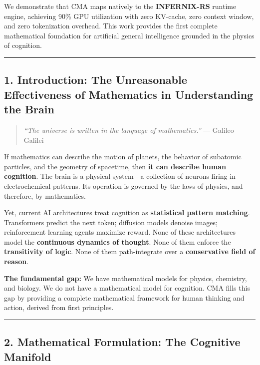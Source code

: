 \documentclass[
  11pt,
  a4paper,
]{article}
\begin{document}
We demonstrate that CMA maps natively to the \textbf{INFERNIX-RS}
runtime engine, achieving 90\% GPU utilization with zero KV-cache, zero
context window, and zero tokenization overhead. This work provides the
first complete mathematical foundation for artificial general
intelligence grounded in the physics of cognition.

\begin{center}\rule{0.5\linewidth}{0.5pt}\end{center}

\subsection{1. Introduction: The Unreasonable Effectiveness of
Mathematics in Understanding the
Brain}\label{introduction-the-unreasonable-effectiveness-of-mathematics-in-understanding-the-brain}

\begin{quote}
\emph{``The universe is written in the language of mathematics.''} ---
Galileo Galilei
\end{quote}

If mathematics can describe the motion of planets, the behavior of
subatomic particles, and the geometry of spacetime, then \textbf{it can
describe human cognition}. The brain is a physical system---a collection
of neurons firing in electrochemical patterns. Its operation is governed
by the laws of physics, and therefore, by mathematics.

Yet, current AI architectures treat cognition as \textbf{statistical
pattern matching}. Transformers predict the next token; diffusion models
denoise images; reinforcement learning agents maximize reward. None of
these architectures model the \textbf{continuous dynamics of thought}.
None of them enforce the \textbf{transitivity of logic}. None of them
path-integrate over a \textbf{conservative field of reason}.

\textbf{The fundamental gap:} We have mathematical models for physics,
chemistry, and biology. We do not have a mathematical model for
cognition. CMA fills this gap by providing a complete mathematical
framework for human thinking and action, derived from first principles.

\begin{center}\rule{0.5\linewidth}{0.5pt}\end{center}

\subsection{2. Mathematical Formulation: The Cognitive
Manifold}\label{mathematical-formulation-the-cognitive-manifold}
\end{document}
